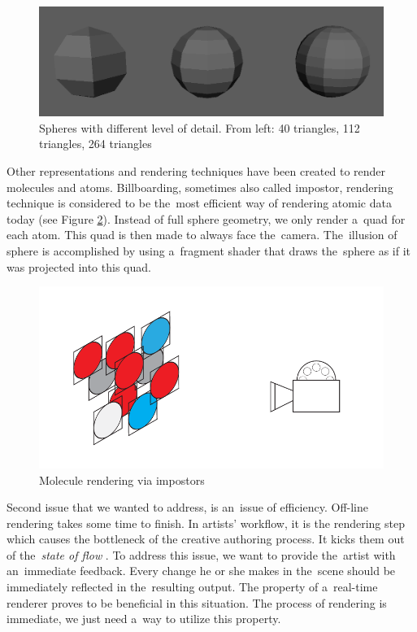 \documentclass[
  digital, %
  table,   %
  nolof,     %
  nolot,     %
  oneside,
]{fithesis3}
\begin{document}
\begin{figure}
  \centering
  \includegraphics[scale=0.3]{images/spheres.png}
  \caption{Spheres with different level of detail. From left: 40 triangles, 112 triangles, 264 triangles}
  \label{fig:spheres-lod}
\end{figure}

Other representations and rendering techniques have been created to render molecules and atoms. Billboarding, sometimes also called impostor, rendering technique is considered to be the most efficient way of rendering atomic data today (see Figure \ref{fig:impostor-rendering}). Instead of full sphere geometry, we only render a quad for each atom. This quad is then made to always face the camera. The illusion of sphere is accomplished by using a fragment shader that draws the sphere as if it was projected into this quad.

\begin{figure}
  \centering
  \includegraphics[scale=0.8]{images/billboards.pdf}
  \caption{Molecule rendering via impostors}
  \label{fig:impostor-rendering}
\end{figure}

Second issue that we wanted to address, is an issue of efficiency. Off-line rendering takes some time to finish. In artists' workflow, it is the rendering step which causes the bottleneck of the creative authoring process. It kicks them out of the \textit{state of flow} \cite{FlowTheoryandResearch}. To address this issue, we want to provide the artist with an immediate feedback. Every change he or she makes in the scene should be immediately reflected in the resulting output. The property of a real-time renderer proves to be beneficial in this situation. The process of rendering is immediate, we just need a way to utilize this property.
\end{document}
